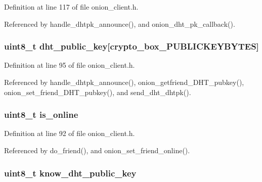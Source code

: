 Definition at line 117 of file onion\+\_\+client.\+h.



Referenced by handle\+\_\+dhtpk\+\_\+announce(), and onion\+\_\+dht\+\_\+pk\+\_\+callback().

\hypertarget{struct_onion___friend_ab2ecaa07625ad0ed5e07d3a1f0dcc939}{
\subsubsection[{dht\+\_\+public\+\_\+key}]{\setlength{\rightskip}{0pt plus 5cm}uint8\+\_\+t dht\+\_\+public\+\_\+key\mbox{[}crypto\+\_\+box\+\_\+\+P\+U\+B\+L\+I\+C\+K\+E\+Y\+B\+Y\+T\+E\+S\mbox{]}}}\label{struct_onion___friend_ab2ecaa07625ad0ed5e07d3a1f0dcc939}


Definition at line 95 of file onion\+\_\+client.\+h.



Referenced by handle\+\_\+dhtpk\+\_\+announce(), onion\+\_\+getfriend\+\_\+\+D\+H\+T\+\_\+pubkey(), onion\+\_\+set\+\_\+friend\+\_\+\+D\+H\+T\+\_\+pubkey(), and send\+\_\+dht\+\_\+dhtpk().

\hypertarget{struct_onion___friend_a6e539a068fed61fab47b62f467c1d208}{
\subsubsection[{is\+\_\+online}]{\setlength{\rightskip}{0pt plus 5cm}uint8\+\_\+t is\+\_\+online}}\label{struct_onion___friend_a6e539a068fed61fab47b62f467c1d208}


Definition at line 92 of file onion\+\_\+client.\+h.



Referenced by do\+\_\+friend(), and onion\+\_\+set\+\_\+friend\+\_\+online().

\hypertarget{struct_onion___friend_a1b66769a2b6f8e5c7306ffcfb7ac0956}{
\subsubsection[{know\+\_\+dht\+\_\+public\+\_\+key}]{\setlength{\rightskip}{0pt plus 5cm}uint8\+\_\+t know\+\_\+dht\+\_\+public\+\_\+key}}\label{struct_onion___friend_a1b66769a2b6f8e5c7306ffcfb7ac0956}


